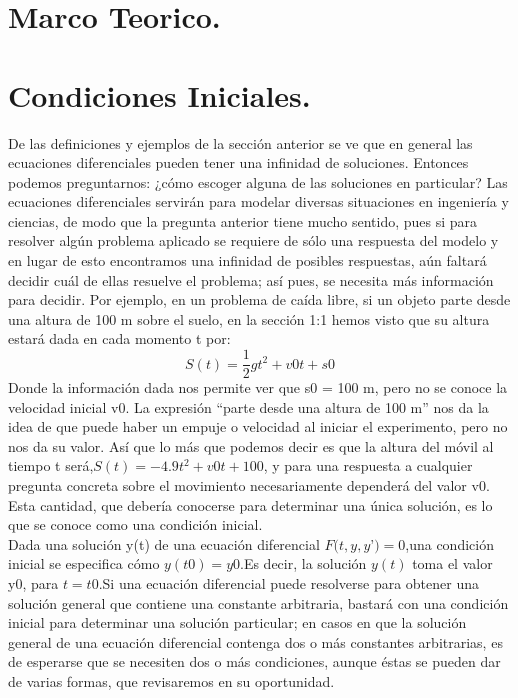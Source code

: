 \documentclass[12pt,a4paper]{article}
\begin{document}
\section{Marco Teorico. }
\section*{Condiciones Iniciales. }
De las definiciones y ejemplos de la sección anterior se ve que en general las ecuaciones diferenciales pueden tener una infinidad de soluciones. Entonces podemos preguntarnos: ¿cómo escoger alguna de las soluciones en particular? Las ecuaciones diferenciales servirán para modelar diversas situaciones en ingeniería y ciencias, de modo que la pregunta anterior tiene mucho sentido, pues si para resolver algún problema aplicado se requiere de sólo una respuesta del modelo y en lugar de esto encontramos una infinidad de posibles respuestas, aún faltará decidir cuál de ellas resuelve el problema; así pues, se necesita más información para decidir.\vspace{0.5cm}
Por ejemplo, en un problema de caída libre, si un objeto parte desde una altura de 100 m sobre el suelo, en la sección 1:1 hemos visto que su altura estará dada en cada momento t por:
\begin{equation*}
  S(t)=\frac{1}{2} gt^2 + v0t + s0
\end{equation*} 
Donde la información dada nos permite ver que s0 = 100 m, pero no se conoce la velocidad inicial v0. La expresión “parte desde una altura de 100 m” nos da la idea de que puede haber un empuje o velocidad al iniciar el experimento, pero no nos da su valor. Así que lo más que podemos decir es que la altura del móvil al tiempo t será,$ S(t)=-4.9t^2 + v0t + 100$, y para una respuesta a cualquier pregunta concreta sobre el movimiento necesariamente dependerá del valor v0. Esta cantidad, que debería conocerse para determinar una única solución, es lo que se conoce como una condición inicial.\\
Dada una solución y(t) de una ecuación diferencial $F(t, y, y$’$) =0$,una condición inicial se especifica cómo $y(t0) = y0$.Es decir, la solución $y(t)$  toma el valor y0, para $t= t0$.Si una ecuación diferencial puede resolverse para obtener una solución general que contiene una constante arbitraria, bastará con una condición inicial para determinar una solución particular; en casos en que la solución general de una ecuación diferencial contenga dos o más constantes arbitrarias, es de esperarse que se necesiten dos o más condiciones, aunque éstas se pueden dar de varias formas, que revisaremos en su oportunidad.
\end{document}
